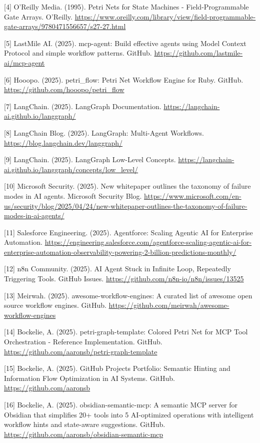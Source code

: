 \documentclass[11pt,a4paper]{article}
\begin{document}
[4] O'Reilly Media. (1995). Petri Nets for State Machines - Field-Programmable Gate Arrays. O'Reilly. \url{https://www.oreilly.com/library/view/field-programmable-gate-arrays/9780471556657/s27-27.html}

[5] LastMile AI. (2025). mcp-agent: Build effective agents using Model Context Protocol and simple workflow patterns. GitHub. \url{https://github.com/lastmile-ai/mcp-agent}

[6] Hooopo. (2025). petri\_flow: Petri Net Workflow Engine for Ruby. GitHub. \url{https://github.com/hooopo/petri_flow}

[7] LangChain. (2025). LangGraph Documentation. \url{https://langchain-ai.github.io/langgraph/}

[8] LangChain Blog. (2025). LangGraph: Multi-Agent Workflows. \url{https://blog.langchain.dev/langgraph/}

[9] LangChain. (2025). LangGraph Low-Level Concepts. \url{https://langchain-ai.github.io/langgraph/concepts/low_level/}

[10] Microsoft Security. (2025). New whitepaper outlines the taxonomy of failure modes in AI agents. Microsoft Security Blog. \url{https://www.microsoft.com/en-us/security/blog/2025/04/24/new-whitepaper-outlines-the-taxonomy-of-failure-modes-in-ai-agents/}

[11] Salesforce Engineering. (2025). Agentforce: Scaling Agentic AI for Enterprise Automation. \url{https://engineering.salesforce.com/agentforce-scaling-agentic-ai-for-enterprise-automation-observability-powering-2-billion-predictions-monthly/}

[12] n8n Community. (2025). AI Agent Stuck in Infinite Loop, Repeatedly Triggering Tools. GitHub Issues. \url{https://github.com/n8n-io/n8n/issues/13525}

[13] Meirwah. (2025). awesome-workflow-engines: A curated list of awesome open source workflow engines. GitHub. \url{https://github.com/meirwah/awesome-workflow-engines}

[14] Bockelie, A. (2025). petri-graph-template: Colored Petri Net for MCP Tool Orchestration - Reference Implementation. GitHub. \url{https://github.com/aaronsb/petri-graph-template}

[15] Bockelie, A. (2025). GitHub Projects Portfolio: Semantic Hinting and Information Flow Optimization in AI Systems. GitHub. \url{https://github.com/aaronsb}

[16] Bockelie, A. (2025). obsidian-semantic-mcp: A semantic MCP server for Obsidian that simplifies 20+ tools into 5 AI-optimized operations with intelligent workflow hints and state-aware suggestions. GitHub. \url{https://github.com/aaronsb/obsidian-semantic-mcp}
\end{document}

